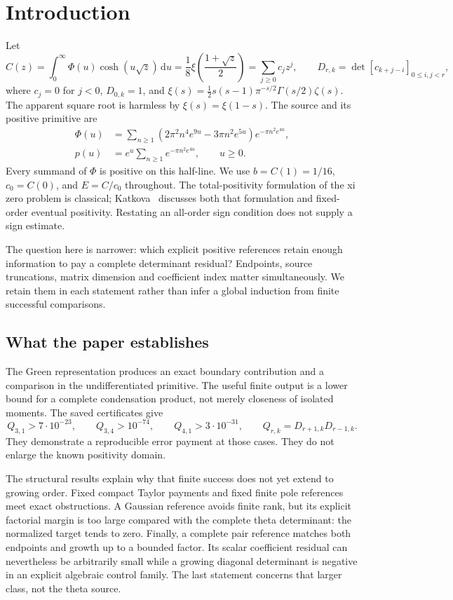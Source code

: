\documentclass[11pt]{article}
\theoremstyle{remark}
\newcommand{\dd}{\,\mathrm d}
\begin{document}
\section{Introduction}
Let
\begin{equation}\label{eq:intro-C}
 C(z)=\int_0^\infty\Phi(u)\cosh(u\sqrt z)\dd u
     =\frac18\xi\!\left(\frac{1+\sqrt z}{2}\right)
     =\sum_{j\ge0}c_jz^j,
 \qquad
 D_{r,k}=\det[c_{k+j-i}]_{0\le i,j<r},
\end{equation}
where $c_j=0$ for $j<0$, $D_{0,k}=1$, and
$\xi(s)=\tfrac12s(s-1)\pi^{-s/2}\Gamma(s/2)\zeta(s)$.
The apparent square root is harmless by $\xi(s)=\xi(1-s)$.
The source and its positive primitive are
\begin{align}
 \Phi(u)&=\sum_{n\ge1}
 (2\pi^2n^4e^{9u}-3\pi n^2e^{5u})e^{-\pi n^2e^{4u}},\\
 p(u)&=e^u\sum_{n\ge1}e^{-\pi n^2e^{4u}},\qquad u\ge0.
\end{align}
Every summand of $\Phi$ is positive on this half-line. We use
$b=C(1)=1/16$, $c_0=C(0)$, and $E=C/c_0$ throughout.
The total-positivity formulation of the xi zero problem is classical;
Katkova~\cite{Katkova0505174v1} discusses both that formulation and
fixed-order eventual positivity. Restating an all-order sign condition
does not supply a sign estimate.

The question here is narrower: which explicit positive references retain
enough information to pay a complete determinant residual? Endpoints,
source truncations, matrix dimension and coefficient index matter
simultaneously. We retain them in each statement rather than infer a
global induction from finite successful comparisons.

\subsection{What the paper establishes}
The Green representation produces an exact boundary contribution and a
comparison in the undifferentiated primitive. The useful finite output is
a lower bound for a complete condensation product, not merely closeness
of isolated moments. The saved certificates give
\[
 Q_{3,1}>7\cdot10^{-23},\qquad
 Q_{3,4}>10^{-74},\qquad
 Q_{4,1}>3\cdot10^{-31},\qquad
 Q_{r,k}=D_{r+1,k}D_{r-1,k}.
\]
They demonstrate a reproducible error payment at those cases. They do
not enlarge the known positivity domain.

The structural results explain why that finite success does not yet
extend to growing order. Fixed compact Taylor payments and fixed finite
pole references meet exact obstructions. A Gaussian reference avoids
finite rank, but its explicit factorial margin is too large compared
with the complete theta determinant: the normalized target tends to zero.
Finally, a complete pair reference matches both endpoints and growth up
to a bounded factor. Its scalar coefficient residual can nevertheless be
arbitrarily small while a growing diagonal determinant is negative in an
explicit algebraic control family. The last statement concerns that
larger class, not the theta source.
\end{document}
